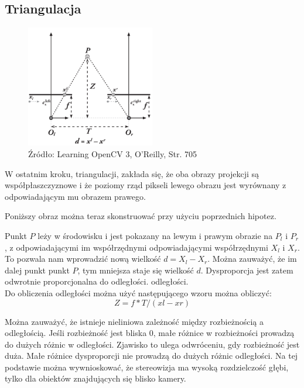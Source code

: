 \documentclass[magisterska]{pracadypl}
\begin{document}
\subsection{Triangulacja}

\begin{figure}[h]  %
    \centering  %
    \includegraphics[width=0.5\textwidth]{images/triangulation.png}  %
    \captionsetup{labelformat=empty, font=footnotesize}
    \caption{Źródło: Learning OpenCV 3, O'Reilly, Str. 705}
    \label{fig:rpi}  %
\end{figure}

W ostatnim kroku, triangulacji, zakłada się, że oba obrazy projekcji są współpłaszczyznowe i że poziomy rząd pikseli lewego obrazu jest wyrównany z odpowiadającym mu obrazem prawego.

Poniższy obraz można teraz skonstruować przy użyciu poprzednich hipotez.

Punkt $P$ leży w środowisku i jest pokazany na
lewym i prawym obrazie na $P_l$ i $P_r$, z odpowiadającymi im współrzędnymi
odpowiadającymi współrzędnymi $X_l$ i $X_r$. To
pozwala nam wprowadzić nową wielkość
$d = X_l - X_r$. Można zauważyć, że im dalej punkt
punkt $P$, tym mniejsza staje się wielkość $d$. Dysproporcja
jest zatem odwrotnie proporcjonalna do odległości.
odległości.\\
Do obliczenia odległości można użyć następującego wzoru
można obliczyć: \[Z=f*T/(xl-xr)\]

Można zauważyć, że istnieje nieliniowa zależność między rozbieżnością a odległością.
Jeśli rozbieżność jest bliska 0, małe różnice w rozbieżności prowadzą do dużych różnic w odległości.
Zjawisko to ulega odwróceniu, gdy rozbieżność jest duża. Małe różnice dysproporcji nie prowadzą do dużych różnic odległości. Na tej podstawie można wywnioskować, że stereowizja ma wysoką rozdzielczość głębi, tylko dla obiektów znajdujących się blisko kamery.
\end{document}
